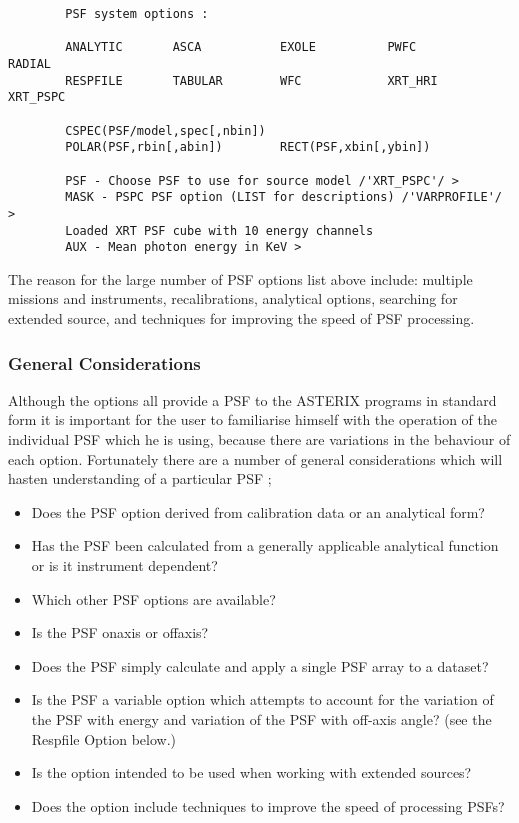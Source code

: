 \documentclass[11pt,fleqn]{article}    %
\begin{document}
\begin{verbatim}
        PSF system options :
 
        ANALYTIC       ASCA           EXOLE          PWFC           RADIAL
        RESPFILE       TABULAR        WFC            XRT_HRI        XRT_PSPC
 
        CSPEC(PSF/model,spec[,nbin])
        POLAR(PSF,rbin[,abin])        RECT(PSF,xbin[,ybin])

        PSF - Choose PSF to use for source model /'XRT_PSPC'/ >   
        MASK - PSPC PSF option (LIST for descriptions) /'VARPROFILE'/ > 
        Loaded XRT PSF cube with 10 energy channels
        AUX - Mean photon energy in KeV > 
\end{verbatim}

The reason for  the  large number of  PSF  options  list above include:
multiple  missions and  instruments,   recalibrations,  analytical options,  
searching   for extended source, and techniques for improving the speed 
of PSF processing.

\subsubsection{General Considerations}
Although the options all provide a PSF to  the ASTERIX programs in standard
form  it is  important for the   user  to familiarise himself with  the operation  of the
individual PSF which he is using, because there are variations in
the behaviour of each  option.  Fortunately there  are a number of  general
considerations which will hasten understanding of a particular PSF ;

\begin{itemize}
\item Does the PSF option derived from calibration data or an analytical form?
\item Has the PSF been  calculated  from a generally applicable  analytical
  function or is it instrument dependent?
\item Which other PSF options are available?
\item Is the PSF onaxis or offaxis?  
\item Does the PSF simply calculate and apply a single PSF array to a dataset?
\item Is  the  PSF a  variable option  which  attempts to  account for  the
  variation of the PSF  with energy and variation of  the PSF with off-axis
  angle? (see the Respfile Option below.)
\item Is the option intended to be used when working with extended sources?
\item Does the option include techniques to improve the speed of processing PSFs?
\end{itemize}
\end{document}
